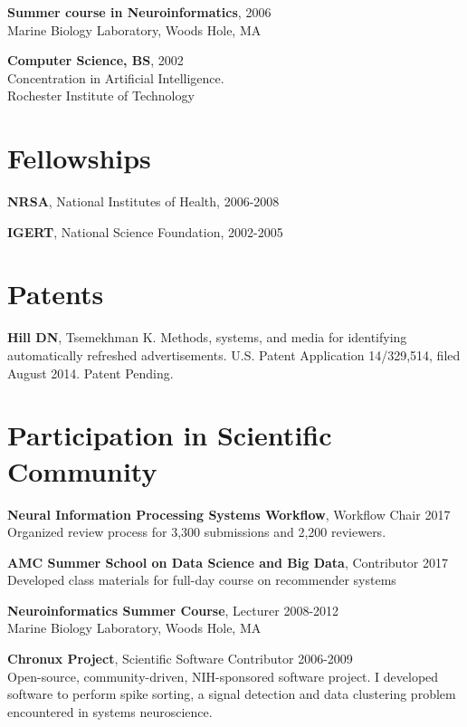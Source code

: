 \documentclass[line,11pt]{res}
\begin{document}
\begin{resume}
 	\textbf{Summer course in Neuroinformatics}, 2006 \\
    Marine Biology Laboratory, Woods Hole, MA 
    
 	\textbf{Computer Science, BS}, 2002 \\
    Concentration in Artificial Intelligence. \\
    Rochester Institute of Technology
    
\section{Fellowships}
\vspace{0.1in} 
 
 	\textbf{NRSA}, National Institutes of Health, 2006-2008
    
    \textbf{IGERT}, National Science Foundation, 2002-2005

\section{Patents}
\vspace{0.1in}
\textbf{Hill DN}, Tsemekhman K. Methods, systems, and media for identifying automatically refreshed advertisements. U.S. Patent Application 14/329,514, filed August 2014. Patent Pending.

\section{Participation in Scientific Community}
\vspace{0.1in} 

	\textbf{Neural Information Processing Systems Workflow}, Workflow Chair 2017 \\
    	Organized review process for 3,300 submissions and 2,200 reviewers.
    
	\textbf{AMC Summer School on Data Science and Big Data}, Contributor 2017 \\
         Developed class materials for full-day course on recommender systems
         
	\textbf{Neuroinformatics Summer Course}, Lecturer 2008-2012 \\
    Marine Biology Laboratory, Woods Hole, MA
    
    	\textbf{Chronux Project}, Scientific Software Contributor 2006-2009 \\
    	Open-source, community-driven, NIH-sponsored software project. I developed software to perform spike sorting, a signal detection and data clustering problem encountered in systems neuroscience. 
    

\end{resume}
\end{document}
